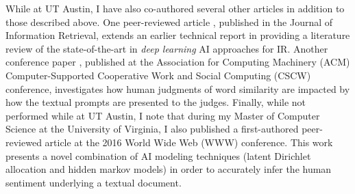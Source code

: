 \documentclass{article}
\begin{document}

 While at UT Austin, I have also co-authored several other articles in addition to those described above. One peer-reviewed article \cite{onal2018}, published in the Journal of Information Retrieval, extends an earlier technical report  \cite{DBLP:journals/corr/ZhangRBDCKMABKM16} in providing a literature review of the state-of-the-art in {\it deep learning} AI approaches for IR. Another conference paper \cite{Bhattacharyya:2017:PCW:3022198.3026357}, published at the Association for Computing Machinery (ACM) Computer-Supported Cooperative Work and Social Computing (CSCW) conference, investigates how human judgments of word similarity are impacted by how the textual prompts are presented to the judges. 
Finally, while not performed while at UT Austin, I note that during my Master of Computer Science at the University of Virginia, I also  published a first-authored peer-reviewed article \cite{Rahman:2016:HTS:2872427.2883072} at the 2016 World Wide Web (WWW) conference. This work presents a novel combination of AI modeling techniques (latent Dirichlet allocation and hidden markov models) in order to accurately infer the human sentiment underlying a textual document.\\
\end{document}
